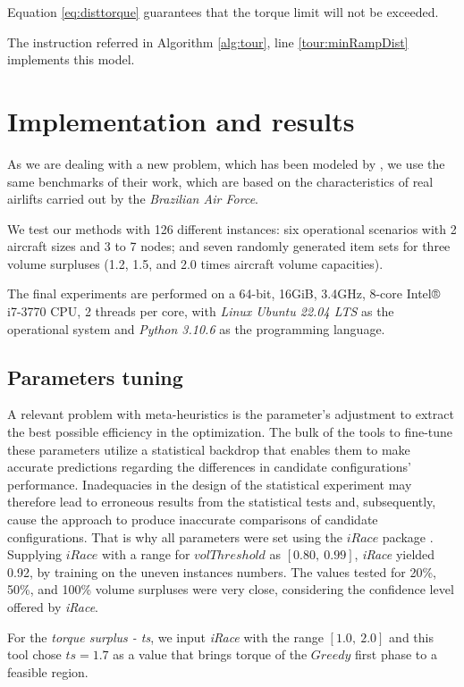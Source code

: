 \documentclass[preprint,authoryear]{elsarticle}
\begin{document}
Equation \ref{eq:disttorque} guarantees that the torque limit will not be exceeded. 

The instruction referred in Algorithm \ref{alg:tour}, line \ref{tour:minRampDist} implements this model.

\section{Implementation and results}
\label{sec6}


As we are dealing with a new problem, which has been modeled by \cite{MesquitaSanches2023}, we use the same benchmarks of their work, which are based on the characteristics of real airlifts carried out by the {\em Brazilian Air Force}.
 
We test our methods with 126 different instances: six operational scenarios with 2 aircraft sizes and 3 to 7 nodes; and seven randomly generated item sets for three volume surpluses (1.2, 1.5, and 2.0 times aircraft volume capacities).

The final experiments are performed on a 64-bit, 16GiB, 3.4GHz, 8-core Intel® i7-3770 CPU, 2 threads per core, with {\it Linux Ubuntu 22.04 LTS} as the operational system and {\it Python 3.10.6} as the programming language.

\subsection{Parameters tuning}

A relevant problem with meta-heuristics is the parameter's adjustment to extract the best possible efficiency in the optimization. The bulk of the tools to fine-tune these parameters utilize a statistical backdrop that enables them to make accurate predictions regarding the differences in candidate configurations' performance. Inadequacies in the design of the statistical experiment may therefore lead to erroneous results from the statistical tests and, subsequently, cause the approach to produce inaccurate comparisons of candidate configurations. That is why all parameters were set using the $iRace$ package \cite{LopezIbanezManuel2016}. Supplying $iRace$ with a range for $volThreshold$ as $[0.80,\ 0.99]$, {\it iRace} yielded 0.92, by training on the uneven instances numbers. The values tested for 20\%, 50\%, and 100\% volume surpluses were very close, considering the confidence level offered by {\it iRace}.

For the {\it torque surplus - ts}, we input {\it iRace} with the range $[1.0,\ 2.0]$ and this tool chose $ts = 1.7$ as a value that brings torque of the $Greedy$ first phase to a feasible region.
\end{document}

